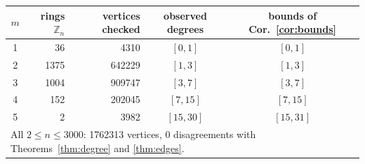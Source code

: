 \begin{tabular}{crrcc}
\toprule
$m$ & rings $\mathbb{Z}_n$ & vertices checked & observed degrees & bounds of Cor.~\ref{cor:bounds} \\
\midrule
1 & 36 & 4310 & $[0,1]$ & $[0,1]$ \\
2 & 1375 & 642229 & $[1,3]$ & $[1,3]$ \\
3 & 1004 & 909747 & $[3,7]$ & $[3,7]$ \\
4 & 152 & 202045 & $[7,15]$ & $[7,15]$ \\
5 & 2 & 3982 & $[15,30]$ & $[15,31]$ \\
\midrule
\multicolumn{5}{l}{All $2\le n\le 3000$: 1762313 vertices, 0 disagreements with Theorems~\ref{thm:degree} and \ref{thm:edges}.} \\
\bottomrule
\end{tabular}

